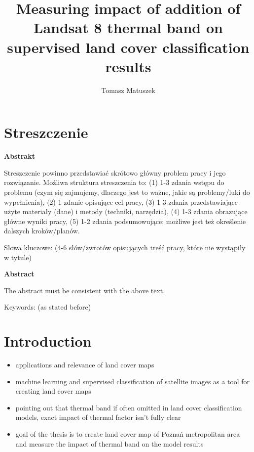 \documentclass{amuthesis}
\author{Tomasz Matuszek}
\title{Measuring impact of addition of Landsat 8 thermal band on
supervised land cover classification results}
\begin{document}

\titlepage


\hypertarget{streszczenie}{%
\chapter*{Streszczenie}\label{streszczenie}}

\textbf{Abstrakt}

Streszczenie powinno przedstawiać skrótowo główny problem pracy i jego
rozwiązanie. Możliwa struktura streszczenia to: (1) 1-3 zdania wstępu do
problemu (czym się zajmujemy, dlaczego jest to ważne, jakie są
problemy/luki do wypełnienia), (2) 1 zdanie opisujące cel pracy, (3) 1-3
zdania przedstawiające użyte materiały (dane) i metody (techniki,
narzędzia), (4) 1-3 zdania obrazujące główne wyniki pracy, (5) 1-2
zdania podsumowujące; możliwe jest też określenie dalszych
kroków/planów.

Słowa kluczowe: (4-6 słów/zwrotów opisujących treść pracy, które nie
wystąpiły w tytule)

\textbf{Abstract}

The abstract must be consistent with the above text.

Keywords: (as stated before)

\newpage

\sf\tighttoc\doublespacing


\hypertarget{sec-intro}{%
\chapter{Introduction}\label{sec-intro}}

\begin{itemize}
\item
  applications and relevance of land cover maps
\item
  machine learning and supervised classification of satellite images as
  a tool for creating land cover maps
\item
  pointing out that thermal band if often omitted in land cover
  classification models, exact impact of thermal factor isn't fully
  clear
\item
  goal of the thesis is to create land cover map of Poznań metropolitan
  area and measure the impact of thermal band on the model results
\end{itemize}
\end{document}
